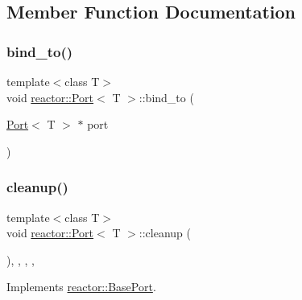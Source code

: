 \subsection{Member Function Documentation}
\mbox{\label{classreactor_1_1Port_a71e1c6fe14a7a6566bc5d5342fa9d16d}} 
\subsubsection{\texorpdfstring{bind\+\_\+to()}{bind\_to()}}
{\footnotesize\ttfamily template$<$class T$>$ \\
void \hyperlink{classreactor_1_1Port}{reactor\+::\+Port}$<$ T $>$\+::bind\+\_\+to (\begin{DoxyParamCaption}\item[{\hyperlink{classreactor_1_1Port}{Port}$<$ T $>$ $\ast$}]{port }\end{DoxyParamCaption})\hspace{0.3cm}{\ttfamily [inline]}}

\mbox{\label{classreactor_1_1Port_a05fdfca6fac003412700103e04ee66fd}} 
\subsubsection{\texorpdfstring{cleanup()}{cleanup()}}
{\footnotesize\ttfamily template$<$class T$>$ \\
void \hyperlink{classreactor_1_1Port}{reactor\+::\+Port}$<$ T $>$\+::cleanup (\begin{DoxyParamCaption}{ }\end{DoxyParamCaption})\hspace{0.3cm}{\ttfamily [inline]}, {\ttfamily [final]}, {\ttfamily [override]}, {\ttfamily [private]}, {\ttfamily [virtual]}}



Implements \hyperlink{classreactor_1_1BasePort_afe81e6747077349da4c420a873783579}{reactor\+::\+Base\+Port}.

\mbox{\label{classreactor_1_1Port_aac7650bcd4a119063858a0dddb5d58aa}} 
